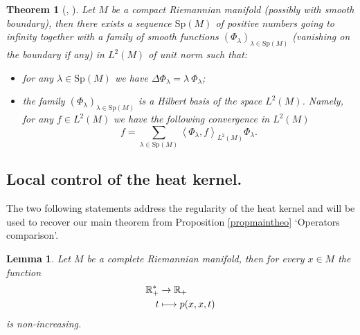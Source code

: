 \documentclass[JEP,XML,SOM,Unicode,NoFloatCountersInSection,published]{cedram}
\def\mto{\mathchoice{\longmapsto}{\mapsto}{\mapsto}{\mapsto}}
\theoremstyle{plain}
\newtheorem{theoreme}[equation]{Theorem}
\newtheorem{lemma}[equation]{Lemma}
\theoremstyle{definition}
\newcommand{\RR}{\mathbb{R}}
\newcommand{\somme}[1]{\sum_{#1}}
\newcommand{\fonctionbis}[4]{\begin{split}
#1 & \to #2 \\
#3 & \mto #4
\end{split}}
\begin{document}
\begin{theoreme}[{\cite[Th.\,10.13]{bookgrigorheatkernel}, \cite[p.\,169]{livrechavel}}]
\label{theospectral}
Let $M$ be a compact Riemannian manifold (possibly with smooth boundary), then there exists a sequence $\mathrm{Sp}(M)$ of positive numbers going to infinity together with a family of smooth functions $(\Phi_{\lambda})_{\lambda \in \mathrm{Sp}(M)}$ (vanishing on the boundary if any) in $L^2(M)$ of unit norm such that:

\begin{itemize}
\item for any $\lambda \in \mathrm{Sp}(M)$ we have $\Delta \Phi_{\lambda} = \lambda \ \Phi_{\lambda}$;
\item the family $(\Phi_{\lambda})_{\lambda \in \mathrm{Sp}(M)}$ is a Hilbert basis of the space $L^2(M)$. Namely, for any $f \in L^2(M)$ we have the following convergence in $L^2(M)$
\[
f = \somme{\lambda \in \mathrm{Sp} (M)} \left<\Phi_{\lambda},f \right>_{L^2(M)} \Phi_{\lambda}.
\]
\end{itemize}
\end{theoreme}

\subsection{Local control of the heat kernel.} The two following statements address the regularity of the heat kernel and will be used to recover our main theorem from Proposition \ref{propmaintheo} `Operators comparison'.

\begin{lemma}
\label{lemmeheatdecreases}
Let $M$ be a complete Riemannian manifold, then for every $x \in M$ the function
\[
\fonctionbis{\RR^*_+}{\RR_+}{t}{p(x,x,t)}
\]
is non-increasing.
\end{lemma}
\end{document}
